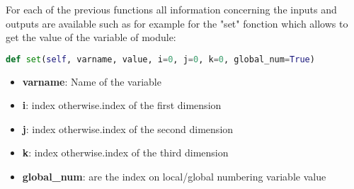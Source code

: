 For each of the previous functions all information concerning the inputs and
outputs are available such as for example for the "set" fonction which allows
to get the value of the variable of \telemacsystem module:

\begin{lstlisting}[language=Python]
def set(self, varname, value, i=0, j=0, k=0, global_num=True)
\end{lstlisting}

\begin{itemize}
\item \textbf{varname}: Name of the variable
\item \textbf{i}: index otherwise.index of the first dimension
\item \textbf{j}: index otherwise.index of the second dimension
\item \textbf{k}: index otherwise.index of the third dimension
\item \textbf{global\_num}: are the index on local/global numbering variable
  value
\end{itemize}
